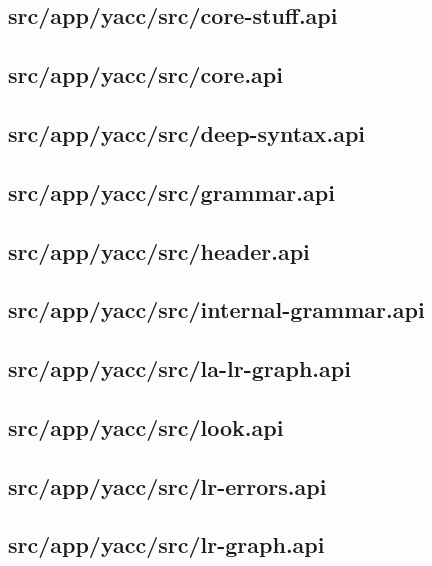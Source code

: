 \subsection{src/app/yacc/src/core-stuff.api}


\subsection{src/app/yacc/src/core.api}


\subsection{src/app/yacc/src/deep-syntax.api}


\subsection{src/app/yacc/src/grammar.api}


\subsection{src/app/yacc/src/header.api}


\subsection{src/app/yacc/src/internal-grammar.api}


\subsection{src/app/yacc/src/la-lr-graph.api}


\subsection{src/app/yacc/src/look.api}


\subsection{src/app/yacc/src/lr-errors.api}


\subsection{src/app/yacc/src/lr-graph.api}


